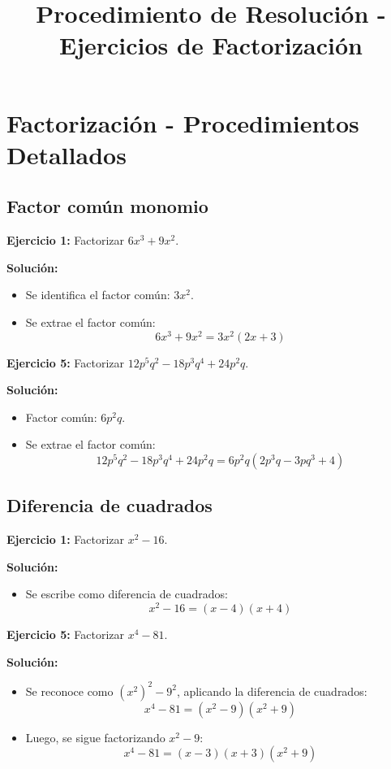 \documentclass{profesor}
\title{Procedimiento de Resolución - Ejercicios de Factorización}
\begin{document}
\maketitle
\tableofcontents
\newpage

\section{Factorización - Procedimientos Detallados}

\subsection{Factor común monomio}
\textbf{Ejercicio 1:}  
Factorizar \( 6x^3 + 9x^2 \).

\textbf{Solución:}
\begin{itemize}
    \item Se identifica el factor común: \( 3x^2 \).
    \item Se extrae el factor común:
    \[
    6x^3 + 9x^2 = 3x^2 (2x + 3)
    \]
\end{itemize}

\textbf{Ejercicio 5:}  
Factorizar \( 12p^5q^2 - 18p^3q^4 + 24p^2q \).

\textbf{Solución:}
\begin{itemize}
    \item Factor común: \( 6p^2q \).
    \item Se extrae el factor común:
    \[
    12p^5q^2 - 18p^3q^4 + 24p^2q = 6p^2q (2p^3q - 3p q^3 + 4)
    \]
\end{itemize}

\subsection{Diferencia de cuadrados}
\textbf{Ejercicio 1:}  
Factorizar \( x^2 - 16 \).

\textbf{Solución:}
\begin{itemize}
    \item Se escribe como diferencia de cuadrados:
    \[
    x^2 - 16 = (x - 4)(x + 4)
    \]
\end{itemize}

\textbf{Ejercicio 5:}  
Factorizar \( x^4 - 81 \).

\textbf{Solución:}
\begin{itemize}
    \item Se reconoce como \( (x^2)^2 - 9^2 \), aplicando la diferencia de cuadrados:
    \[
    x^4 - 81 = (x^2 - 9)(x^2 + 9)
    \]
    \item Luego, se sigue factorizando \( x^2 - 9 \):
    \[
    x^4 - 81 = (x - 3)(x + 3)(x^2 + 9)
    \]
\end{itemize}
\end{document}
